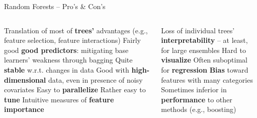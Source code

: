 \begin{frame}{Random Forests -- Pro's \& Con's}

\begin{columns}[onlytextwidth]
  \begin{column}{0.5\textwidth}
    \footnotesize
    \begin{itemize}
      \positem Translation of most of \textbf{trees'} advantages (e.g., 
      feature selection, feature interactions)
      \positem Fairly good \textbf{good predictors}: mitigating base learners' 
      weakness through bagging
      \positem Quite \textbf{stable} w.r.t. changes in data
      \positem Good with \textbf{high-dimensional} data, even in presence of 
      noisy covariates
      \positem Easy to \textbf{parallelize}
      \positem Rather easy to \textbf{tune}
      \positem Intuitive measures of \textbf{feature importance}
    \end{itemize}
  \end{column}
  \begin{column}{0.5\textwidth}
    \footnotesize
    \begin{itemize}
      \negitem Loss of individual trees' \textbf{interpretability} -- at least, 
      for large ensembles
      \negitem Hard to \textbf{visualize}
      \negitem Often suboptimal for \textbf{regression}
      \negitem \textbf{Bias} toward features with many categories
      \negitem Sometimes inferior in \textbf{performance} to other methods 
      (e.g., boosting)
    \end{itemize}
  \end{column}
\end{columns}

\vfill

\small


\end{frame}


